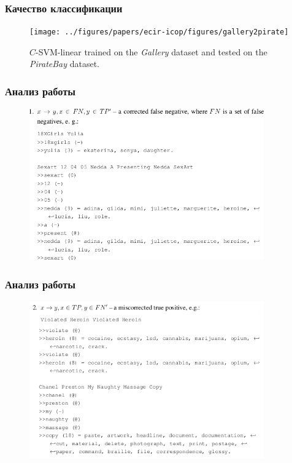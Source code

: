 \begin{frame}
\frametitle{Качество классификации}

\begin{figure}
\centering
\texttt{[image: ../figures/papers/ecir-icop/figures/gallery2pirate]} 
\caption{$C$-SVM-linear trained on the \textit{Gallery} dataset and tested on the \textit{PirateBay} dataset. }
\label{fig:gallery2pirate}
\end{figure}
\end{frame}




\begin{frame}
\frametitle{Анализ работы}

\begin{figure}
\centering
\includegraphics[width=0.9\textwidth]{figures/1}
\end{figure}
\end{frame}




\begin{frame}
\frametitle{Анализ работы}

\begin{figure}
\centering
\includegraphics[width=0.9\textwidth]{figures/22}
\end{figure}
\end{frame}





